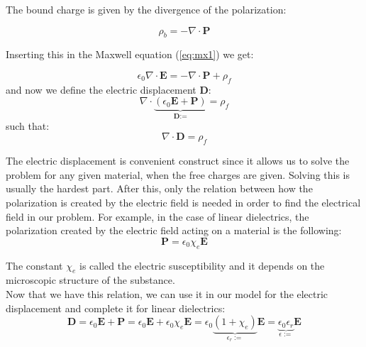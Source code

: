 The bound charge is given by the divergence of the polarization:

\begin{equation}
\rho_b = -\nabla\cdot\textbf{P}
\end{equation}

Inserting this in the Maxwell equation (\ref{eq:mx1}) we get:

\begin{equation}
\epsilon_0\nabla \cdot \textbf{E} = -\nabla\cdot\textbf{P} + \rho_f \nonumber
\end{equation}
and now we define the electric displacement $\textbf{D}$:
\begin{equation}\label{eq:displ}
\nabla \cdot\underbrace{(\epsilon_0 \textbf{E} + \textbf{P})}_{\textbf{D}:=} = \rho_f 
\end{equation}
such that:
\begin{equation}
\nabla \cdot\textbf{D}= \rho_f \nonumber
\end{equation}

The electric displacement is convenient construct since it allows us to solve the problem for any given material, when the free charges are given. Solving this is usually the hardest part. After this, only the relation between how the polarization is created by the electric field is needed in order to find the electrical field in our problem. For example, in the case of linear dielectrics, the polarization created by the electric field acting on a material is the following:\\

\begin{equation}\label{eq:lineardielec}
\textbf{P} = \epsilon_0\chi_e\textbf{E}
\end{equation}

The constant $\chi_e$ is called the electric susceptibility and it depends on the microscopic structure of the substance.\\

Now that we have this relation, we can use it in our model for the electric displacement and complete it for linear dielectrics:\\

\begin{equation}
\textbf{D} = \epsilon_0\textbf{E} + \textbf{P} = \epsilon_0\textbf{E} + \epsilon_0\chi_e\textbf{E} = \epsilon_0\underbrace{(1 +\chi_e)}_{\epsilon_r:=}\textbf{E} =  \underbrace{\epsilon_0\epsilon_r}_{\epsilon:=}\textbf{E} \nonumber
\end{equation}

